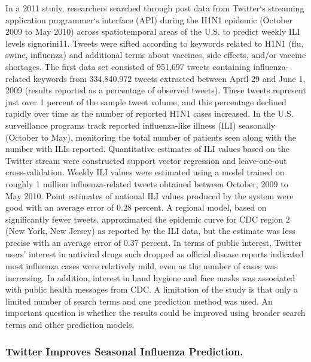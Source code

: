 \documentclass[sigconf]{acmart}
\begin{document}
In a 2011 study, researchers searched through post data from Twitter`s streaming 
application programmer`s interface (API) during the H1N1 epidemic (October 2009 to May 2010) 
across spatiotemporal areas of the U.S. to predict weekly ILI levels {signorini11}. Tweets 
were sifted according to keywords related to H1N1 (flu, swine, influenza) and additional 
terms about vaccines, side effects, and/or vaccine shortages. The first data set consisted 
of 951,697 tweets containing influenza-related keywords from 334,840,972 tweets extracted 
between April 29 and June 1, 2009 (results reported as a percentage of observed tweets). 
These tweets represent just over 1 percent of the sample tweet volume, and this percentage 
declined rapidly over time as the number of reported H1N1 cases increased. In the U.S. 
surveillance programs track reported influenza-like illness (ILI) seasonally (October to 
May), monitoring the total number of patients seen along with the number with ILIs reported. 
Quantitative estimates of ILI values based on the Twitter stream were constructed support 
vector regression and leave-one-out cross-validation. Weekly ILI values were estimated using 
a model trained on roughly 1 million influenza-related tweets obtained between October, 2009 
to May 2010. Point estimates of national ILI values produced by the system were good with 
an average error of 0.28 percent. A regional model, based on significantly fewer tweets, 
approximated the epidemic curve for CDC region 2 (New York, New Jersey) as reported by the 
ILI data, but the estimate was less precise with an average error of 0.37 percent. In terms 
of public interest, Twitter users' interest in antiviral drugs such dropped as official 
disease reports indicated most influenza cases were relatively mild, even as the number of 
cases was increasing. In addition, interest in hand hygiene and face masks was associated 
with public health messages from CDC. A limitation of the study is that only a limited 
number of search terms and one prediction method was used. An important question is whether 
the results could be improved using broader search terms and other prediction models. 


\subsubsection{Twitter Improves Seasonal Influenza Prediction. \cite{achrekar12}}
\end{document}
